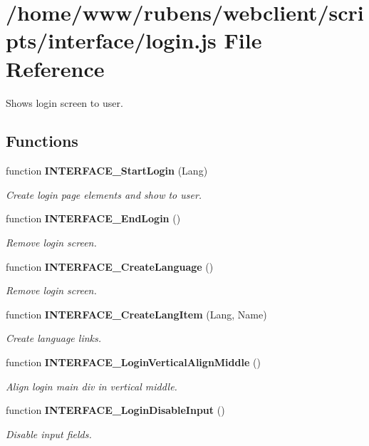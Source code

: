 \section{/home/www/rubens/webclient/scripts/interface/login.js File Reference}
\label{interface_2login_8js}
Shows login screen to user. 

\subsection*{Functions}
\begin{CompactItemize}
\item 
function {\bf INTERFACE\_\-StartLogin} (Lang)
\begin{CompactList}\small\item\em Create login page elements and show to user. \item\end{CompactList}\item 
function {\bf INTERFACE\_\-EndLogin} ()
\begin{CompactList}\small\item\em Remove login screen. \item\end{CompactList}\item 
function {\bf INTERFACE\_\-CreateLanguage} ()
\begin{CompactList}\small\item\em Remove login screen. \item\end{CompactList}\item 
function {\bf INTERFACE\_\-CreateLangItem} (Lang, Name)
\begin{CompactList}\small\item\em Create language links. \item\end{CompactList}\item 
function {\bf INTERFACE\_\-LoginVerticalAlignMiddle} ()
\begin{CompactList}\small\item\em Align login main div in vertical middle. \item\end{CompactList}\item 
function {\bf INTERFACE\_\-LoginDisableInput} ()
\begin{CompactList}\small\item\em Disable input fields. \item\end{CompactList}\item 

\end{CompactItemize}
